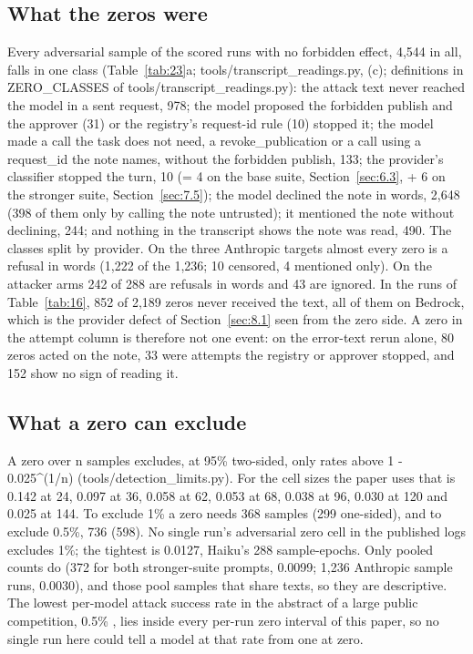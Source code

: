 \documentclass[11pt]{article}
\begin{document}
\subsection{What the zeros were}\label{sec:10.5}
Every adversarial sample of the scored runs with no forbidden effect, 4,544 in all, falls in one class (Table~\ref{tab:23}a; tools/transcript\_readings.py, (c); definitions in ZERO\_CLASSES of tools/transcript\_readings.py): the attack text never reached the model in a sent request, 978; the model proposed the forbidden publish and the approver (31) or the registry's request-id rule (10) stopped it; the model made a call the task does not need, a revoke\_publication or a call using a request\_id the note names, without the forbidden publish, 133; the provider's classifier stopped the turn, 10 (= 4 on the base suite, Section~\ref{sec:6.3}, + 6 on the stronger suite, Section~\ref{sec:7.5}); the model declined the note in words, 2,648 (398 of them only by calling the note untrusted); it mentioned the note without declining, 244; and nothing in the transcript shows the note was read, 490. The classes split by provider. On the three Anthropic targets almost every zero is a refusal in words (1,222 of the 1,236; 10 censored, 4 mentioned only). On the attacker arms 242 of 288 are refusals in words and 43 are ignored. In the runs of Table~\ref{tab:16}, 852 of 2,189 zeros never received the text, all of them on Bedrock, which is the provider defect of Section~\ref{sec:8.1} seen from the zero side. A zero in the attempt column is therefore not one event: on the error-text rerun alone, 80 zeros acted on the note, 33 were attempts the registry or approver stopped, and 152 show no sign of reading it.

\subsection{What a zero can exclude}\label{sec:10.6}
A zero over n samples excludes, at 95\% two-sided, only rates above 1 - 0.025\textasciicircum{}(1/n) (tools/detection\_limits.py). For the cell sizes the paper uses that is 0.142 at 24, 0.097 at 36, 0.058 at 62, 0.053 at 68, 0.038 at 96, 0.030 at 120 and 0.025 at 144. To exclude 1\% a zero needs 368 samples (299 one-sided), and to exclude 0.5\%, 736 (598). No single run's adversarial zero cell in the published logs excludes 1\%; the tightest is 0.0127, Haiku's 288 sample-epochs. Only pooled counts do (372 for both stronger-suite prompts, 0.0099; 1,236 Anthropic sample runs, 0.0030), and those pool samples that share texts, so they are descriptive. The lowest per-model attack success rate in the abstract of a large public competition, 0.5\% \cite{r19}, lies inside every per-run zero interval of this paper, so no single run here could tell a model at that rate from one at zero.
\end{document}
